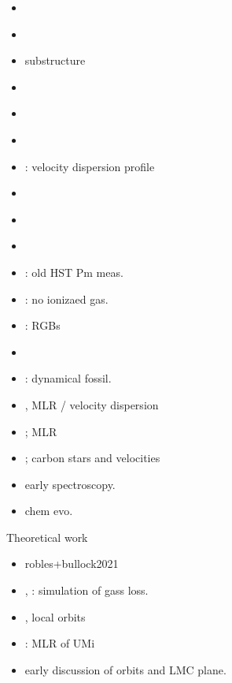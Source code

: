 \begin{itemize}
\tightlist
\item
  \citet{sestito+2023b}
\item
  \citet{pace+2020}
\item
  \citet{pace+2014} substructure
\item
  \citet{bellazzini+2002}
\item
  \citet{hargreaves+1994}
\item
  \citet{martinez-delgado+2001}
\item
  \citet{munoz+2005}: velocity dispersion profile
\item
  \citet{palma+2003}
\item
  \citet{spencer+2018}
\item
  \citet{vitral+2023}
\item
  \citet{piatek+2005}: old HST Pm meas.
\item
  \citet{gallagher+2003}: no ionizaed gas.
\item
  \citet{shetrone+cote+stetson2001}: RGBs
\item
  \citet{wilkinson+2004}
\item
  \citet{kleyna+2003}: dynamical fossil.
\item
  \citet{pryor+kormendy1990}, \citet{lake1990} MLR / velocity dispersion
\item
  \citet{armandroff+olszewski+pryor1995};
  \citet{olszewski+pryor+armandroff1996} MLR
\item
  \citet{aaronson+olszewski+hodge1983}; \citet{aaronson1983} carbon
  stars and velocities
\item
  \citet{stetson1984} early spectroscopy.
\item
  \citet{tsujimoto+shigeyama2002} chem evo.
\end{itemize}

Theoretical work

\begin{itemize}
\tightlist
\item
  robles+bullock2021
\item
  \citet{caproni+lanfranchi2021}, \citet{caproni+2015}: simulation of
  gass loss.
\item
  \citet{bajkova+bobylev2017}, local orbits
\item
  \citet{gomez-flechoso+martinez-delgado2003}: MLR of UMi
\item
  \citet{lynden-bell1976} early discussion of orbits and LMC plane.
\end{itemize}

